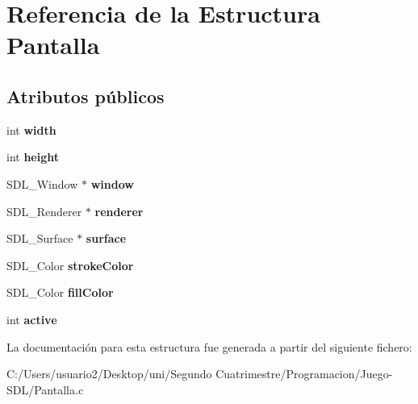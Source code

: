 \hypertarget{struct_pantalla}{}\section{Referencia de la Estructura Pantalla}
\label{struct_pantalla}
\subsection*{Atributos públicos}
\begin{DoxyCompactItemize}
\item 
int {\bfseries width}\hypertarget{struct_pantalla_a0e9fa97feaefd883cbd532f737d9554e}{}\label{struct_pantalla_a0e9fa97feaefd883cbd532f737d9554e}

\item 
int {\bfseries height}\hypertarget{struct_pantalla_ae15fda85fd6288ea074a7a1b300fd58a}{}\label{struct_pantalla_ae15fda85fd6288ea074a7a1b300fd58a}

\item 
S\+D\+L\+\_\+\+Window $\ast$ {\bfseries window}\hypertarget{struct_pantalla_a8dec9e2d342435a93855aeb511ccd862}{}\label{struct_pantalla_a8dec9e2d342435a93855aeb511ccd862}

\item 
S\+D\+L\+\_\+\+Renderer $\ast$ {\bfseries renderer}\hypertarget{struct_pantalla_aef7ea33823f4c47b5375139c124a8029}{}\label{struct_pantalla_aef7ea33823f4c47b5375139c124a8029}

\item 
S\+D\+L\+\_\+\+Surface $\ast$ {\bfseries surface}\hypertarget{struct_pantalla_a285cfe423fdb8f711ff813b909e0e52e}{}\label{struct_pantalla_a285cfe423fdb8f711ff813b909e0e52e}

\item 
S\+D\+L\+\_\+\+Color {\bfseries stroke\+Color}\hypertarget{struct_pantalla_abd2fd66b3aba1f8ade0bc7f132b63038}{}\label{struct_pantalla_abd2fd66b3aba1f8ade0bc7f132b63038}

\item 
S\+D\+L\+\_\+\+Color {\bfseries fill\+Color}\hypertarget{struct_pantalla_ab15d952c42d74e338c2ca5ee6ff318c6}{}\label{struct_pantalla_ab15d952c42d74e338c2ca5ee6ff318c6}

\item 
int {\bfseries active}\hypertarget{struct_pantalla_ad8de13a81c87bec0924e85e6ab14fac2}{}\label{struct_pantalla_ad8de13a81c87bec0924e85e6ab14fac2}

\end{DoxyCompactItemize}


La documentación para esta estructura fue generada a partir del siguiente fichero\+:\begin{DoxyCompactItemize}
\item 
C\+:/\+Users/usuario2/\+Desktop/uni/\+Segundo Cuatrimestre/\+Programacion/\+Juego-\/\+S\+D\+L/Pantalla.\+c\end{DoxyCompactItemize}
